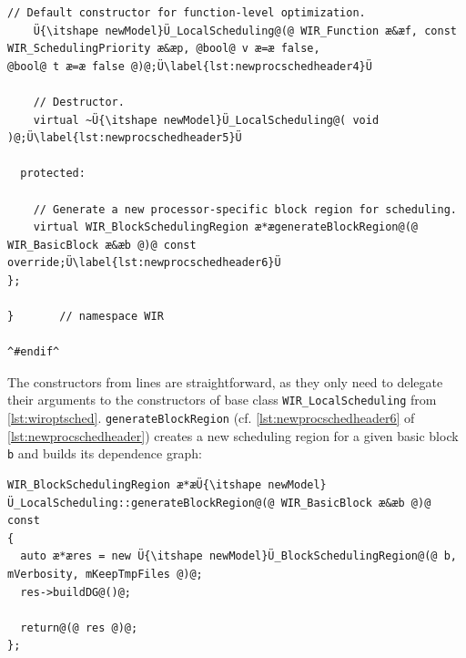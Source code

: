 \begin{enumerate}
\begin{lstlisting}[style=code,float=!t,caption={Header File for a New Processor Model's Local Instruction Scheduler},label=lst:newprocschedheader]
    // Default constructor for function-level optimization.
    Ü{\itshape newModel}Ü_LocalScheduling@(@ WIR_Function æ&æf, const WIR_SchedulingPriority æ&æp, @bool@ v æ=æ false,                                         @bool@ t æ=æ false @)@;Ü\label{lst:newprocschedheader4}Ü

    // Destructor.
    virtual ~Ü{\itshape newModel}Ü_LocalScheduling@( void )@;Ü\label{lst:newprocschedheader5}Ü

  protected:

    // Generate a new processor-specific block region for scheduling.
    virtual WIR_BlockSchedulingRegion æ*ægenerateBlockRegion@(@ WIR_BasicBlock æ&æb @)@ const override;Ü\label{lst:newprocschedheader6}Ü
};

}       // namespace WIR

^#endif^
\end{lstlisting}

\end{enumerate}

The constructors from lines  are straightforward, as they only need to delegate their arguments to the constructors of base class \texttt{WIR\_LocalScheduling} from \cref{lst:wiroptsched}.
\texttt{generateBlockRegion} (cf. \cref{lst:newprocschedheader6} of \cref{lst:newprocschedheader}) creates a new scheduling region for a given basic block \texttt{b} and builds its dependence graph: \\
\begin{lstlisting}[style=code,float=!h,belowskip=-0.8 \baselineskip]
WIR_BlockSchedulingRegion æ*æÜ{\itshape newModel}Ü_LocalScheduling::generateBlockRegion@(@ WIR_BasicBlock æ&æb @)@ const
{
  auto æ*æres = new Ü{\itshape newModel}Ü_BlockSchedulingRegion@(@ b, mVerbosity, mKeepTmpFiles @)@;
  res->buildDG@()@;

  return@(@ res @)@;
};
\end{lstlisting}

